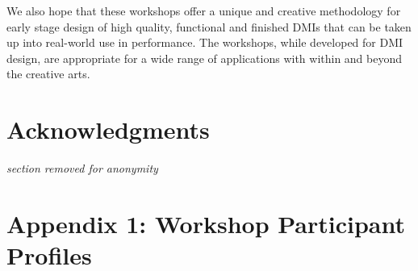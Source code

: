 \documentclass[letterpaper, 12pt]{article}
\begin{document}
We also hope that these workshops offer a unique and creative methodology for early stage design of high quality, functional and finished DMIs that can be taken up into real-world use in performance. The workshops, while developed for DMI design, are appropriate for a wide range of applications with within and beyond the creative arts. 

\section{Acknowledgments}

\noindent \emph{section removed for anonymity}








\section*{Appendix 1: Workshop Participant Profiles}
\end{document}
